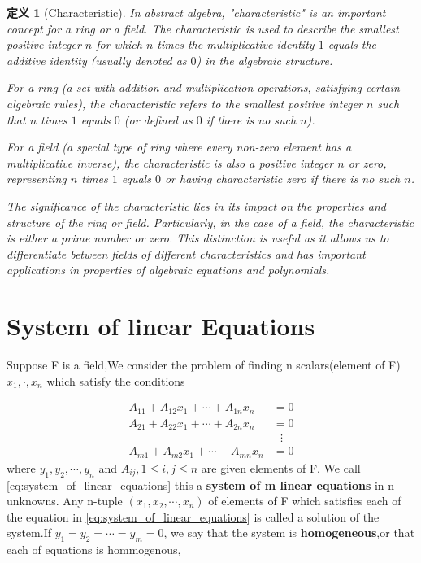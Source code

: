 \documentclass[11pt, a4paper, oneside,UTF8]{ctexbook}
\newtheorem{definition}{\indent 定义}[section]
\begin{document}
\begin{definition}[Characteristic]
	In abstract algebra, "characteristic" is an important concept for a ring or a field. The characteristic is used to describe the smallest positive integer $n$ for which $n$ times the multiplicative identity $1$ equals the additive identity (usually denoted as $0$) in the algebraic structure.

	For a ring (a set with addition and multiplication operations, satisfying certain algebraic rules), the characteristic refers to the smallest positive integer $n$ such that $n$ times $1$ equals $0$ (or defined as $0$ if there is no such $n$).

	For a field (a special type of ring where every non-zero element has a multiplicative inverse), the characteristic is also a positive integer $n$ or zero, representing $n$ times $1$ equals $0$ or having characteristic zero if there is no such $n$.

	The significance of the characteristic lies in its impact on the properties and structure of the ring or field. Particularly, in the case of a field, the characteristic is either a prime number or zero. This distinction is useful as it allows us to differentiate between fields of different characteristics and has important applications in properties of algebraic equations and polynomials.
\end{definition}

\section{System of linear Equations} %
\label{sec:system_of_linear_equations}



Suppose F is a field,We consider the problem of finding n scalars(element of F)$x_1,\cdot,x_n$ which satisfy the conditions

\begin{equation}
  \begin{aligned}
    A_{11}+A_{12}x_1+\cdots+A_{1n}x_n &= 0 \\
    A_{21}+A_{22}x_1+\cdots+A_{2n}x_n &= 0 \\
    & \,\,\,\, \vdots \\
    A_{m1}+A_{m2}x_1+\cdots+A_{mn}x_n &= 0
  \end{aligned}
  \label{eq:system_of_linear_equations}
\end{equation}
where $y_1,y_2,\cdots,y_n$ and $A_{ij},1\leq i,j\leq n$ are given elements of F.
We call \ref{eq:system_of_linear_equations} this a \textbf{system of m linear equations} in n unknowns.
Any n-tuple $(x_1,x_2,\cdots,x_n)$ of elements of F which satisfies each of the equation in \ref{eq:system_of_linear_equations} is called a solution of the system.If $y_1 = y_2 = \cdots = y_m = 0$,
we say that the system is \textbf{homogeneous},or that each of equations is hommogenous,
\end{document}
